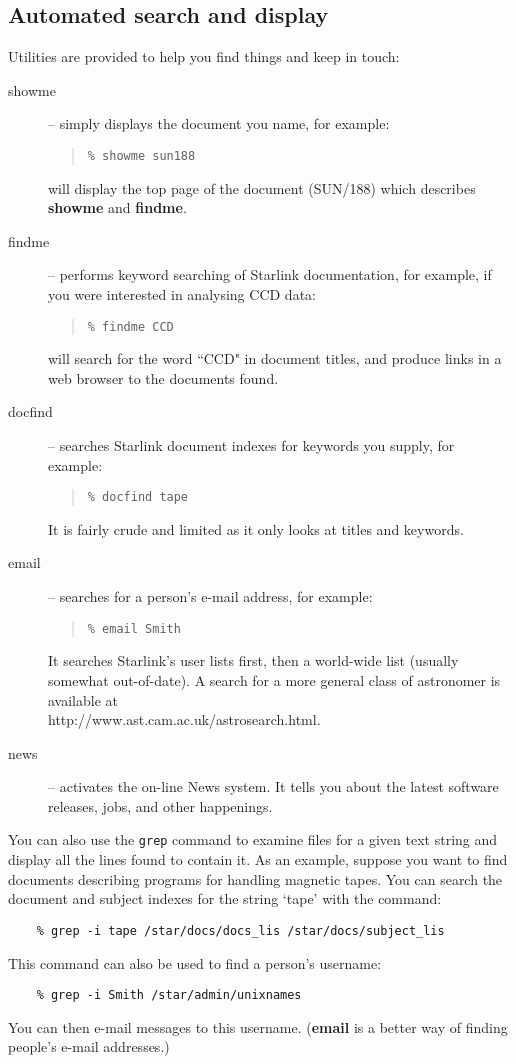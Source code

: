 \documentclass[twoside]{article}
\newcommand{\htmladdnormallink}[2]{#1}
\newcommand{\xref}[3]{#1}
\begin{document}
\subsection{Automated search and display}

Utilities are provided to help you find things and keep in touch:

\begin{description}
\item [showme] -- simply displays the document you name, for example:
 \begin{quote}
 {\tt \% showme sun188}
 \end{quote}
 will display the top page of the document
 (\xref{SUN/188}{sun188}{})
 which describes {\bf showme} and {\bf findme}.
\item [findme] -- performs keyword searching of Starlink documentation,
 for example, if you were interested in analysing CCD data:
 \begin{quote}
 {\tt \% findme CCD}
 \end{quote}
 will search for the word ``CCD" in document titles, and produce links in a
 web browser to the documents found.
\item [docfind] -- searches Starlink document indexes for keywords you supply,
 for example:
 \begin{quote}
 {\tt \% docfind tape}
 \end{quote}
 It is fairly crude and limited as it only looks at titles and keywords.
\item [email] -- searches for a person's e-mail address, for example:
 \begin{quote}
 {\tt \% email Smith}
 \end{quote}
 It searches Starlink's user lists first, then a world-wide list (usually
 somewhat out-of-date).
 A search for a more general class of astronomer is available at\\
 \htmladdnormallink{http://www.ast.cam.ac.uk/astrosearch.html}
 {http://www.ast.cam.ac.uk/astrosearch.html}.
\item [news] -- activates the on-line News system.
 It tells you about the latest software releases, jobs, and other happenings.
\end{description}

You can also use the {\tt grep} command to examine files for a given text
string and display all the lines found to contain it.
As an example, suppose you want to find documents describing programs for
handling magnetic tapes.
You can search the document and subject indexes for the string `tape' with the
command:
{\small
\begin{verbatim}
    % grep -i tape /star/docs/docs_lis /star/docs/subject_lis
\end{verbatim}
}
This command can also be used to find a person's username:
{\small
\begin{verbatim}
    % grep -i Smith /star/admin/unixnames
\end{verbatim}
}
You can then e-mail messages to this username.
({\bf email} is a better way of finding people's e-mail addresses.)
\end{document}
